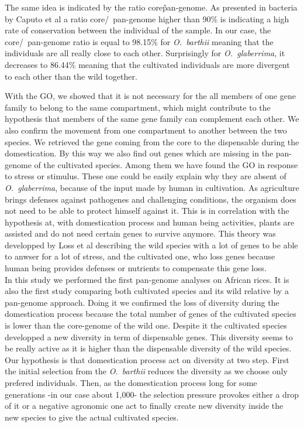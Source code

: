 \documentclass[10pt,letterpaper]{article}
\begin{document}
The same idea is indicated by the ratio core\~pan-genome. As presented in bacteria by Caputo et al \cite{Caputo2015} a ratio core/~pan-genome higher than 90\% is indicating a high rate of conservation between the individual of the sample. In our case, the core/~pan-genome ratio is equal to 98.15\% for \emph{O.~barthii} meaning that the individuals are all really close to each other. Surprisingly for \emph{O.~glaberrima}, it decreases to 86.44\% meaning that the cultivated individuals are more divergent to each other than the 
wild together.

With the GO, we showed that it is not necessary for the all members of one gene family to belong to the same compartment, which might contribute to the hypothesis that members of the same gene family can complement each other.
We also confirm the movement from one compartment to another between the two species. We retrieved the gene coming from the core to the dispensable during the domestication. By this way we also find out genes which are missing in the 
pan-genome of the cultivated species. Among them we have found the GO in response to stress or stimulus. These one could be easily explain why they are absent of \emph{O.~glaberrima}, because of 
the input made by human in cultivation. As agriculture brings defenses against pathogenes and challenging conditions, the organism does not need to be able to protect himself against it. This is in correlation with the hypothesis at, with 
domestication process and human being activities, plants are assisted and do not need certain genes to survive anymore. This theory was developped by Loss et al \cite{Loss2012} describing the wild species with a lot of genes to be able 
to anwser for a lot of stress, and the cultivated one, who loss genes because human being provides defenses or nutrients to compensate this gene loss.\\

In this study we performed the first pan-genome analyses on African rices. It is also the first study comparing both cultivated species and its wild relative by a pan-genome approach. Doing it we confirmed the loss of diversity during the domestication process because the total number of genes of the cultivated species is lower than the core-genome of the wild one. Despite it the cultivated species developped a new diversity in term of dispensable genes.
This diversity seems to be really active as it is higher than the dispensable diversity of the wild species. Our hypothesis is that domestication process act on diversity at two step. First the initial selection from the \emph{O.~barthii} reduces the diversity as we choose only prefered individuals. Then, as the domestication process long for some generations -in our case about 1,000- the selection pressure provokes either a drop of it or a negative agronomic one act 
to finally create new diversity inside the new species to give the actual cultivated species.
\end{document}
